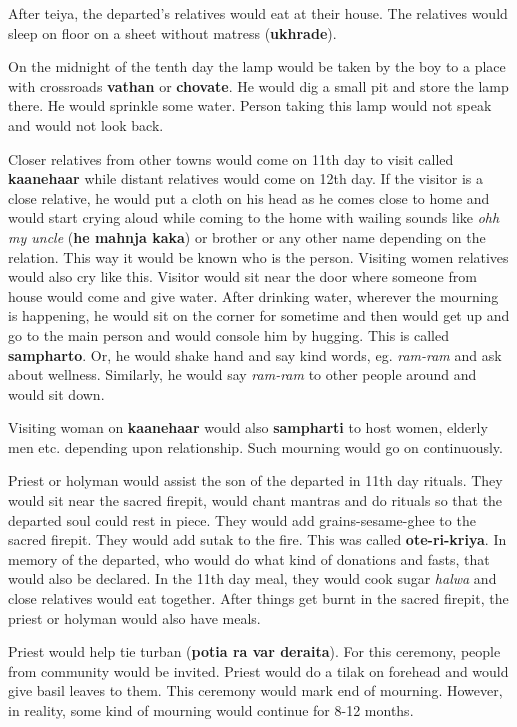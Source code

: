 After teiya, the departed's relatives would eat at their house. The relatives
would sleep on floor on a sheet without matress (\textbf{ukhrade}).

On the midnight of the tenth day the lamp would be taken by the boy to a place
with crossroads \textbf{vathan} or \textbf{chovate}. He would dig a small pit
and store the lamp there. He would sprinkle some water. Person taking this lamp
would not speak and would not look back.

Closer relatives from other towns would come on 11th day to visit called
\textbf{kaanehaar} while distant relatives would come on 12th day. If the
visitor is a close relative, he would put a cloth on his head as he comes close
to home and would start crying aloud while coming to the home with wailing
sounds like \textit{ohh my uncle} (\textbf{he mahnja kaka}) or brother or any
other name depending on the relation. This way it would be known who is the
person. Visiting women relatives would also cry like this. Visitor would sit
near the door where someone from house would come and give water. After
drinking water, wherever the mourning is happening, he would sit on the corner
for sometime and then would get up and go to the main person and would console
him by hugging. This is called \textbf{sampharto}. Or, he would shake hand and
say kind words, eg. \textit{ram-ram} and ask about wellness. Similarly, he
would say \textit{ram-ram} to other people around and would sit down.

Visiting woman on \textbf{kaanehaar} would also \textbf{sampharti} to host
women, elderly men etc. depending upon relationship. Such mourning would go on
continuously.

Priest or holyman would assist the son of the departed in 11th day rituals.
They would sit near the sacred firepit, would chant mantras and do rituals so
that the departed soul could rest in piece. They would add grains-sesame-ghee
to the sacred firepit. They would add sutak to the fire. This was called
\textbf{ote-ri-kriya}. In memory of the departed, who would do what kind of
donations and fasts, that would also be declared. In the 11th day meal, they
would cook sugar \textit{halwa} and close relatives would eat together. After
things get burnt in the sacred firepit, the priest or holyman would also have
meals.

Priest would help tie turban (\textbf{potia ra var deraita}). For this
ceremony, people from community would be invited. Priest would do a tilak on
forehead and would give basil leaves to them. This ceremony would mark end of
mourning. However, in reality, some kind of mourning would continue for 8-12
months.

